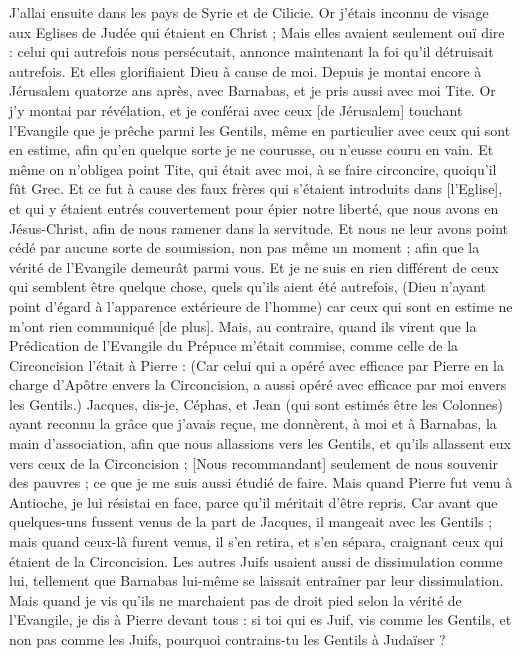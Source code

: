 \begin{multicols}{2}
J'allai ensuite dans les pays de Syrie et de Cilicie.
Or j'étais inconnu de visage aux Eglises de Judée qui étaient en Christ ;
Mais elles avaient seulement ouï dire : celui qui autrefois nous persécutait, annonce maintenant la foi qu'il détruisait autrefois.
Et elles glorifiaient Dieu à cause de moi.
\VerseOne{}Depuis je montai encore à Jérusalem quatorze ans après, avec Barnabas, et je pris aussi avec moi Tite.
Or j'y montai par révélation, et je conférai avec ceux [de Jérusalem] touchant l'Evangile que je prêche parmi les Gentils, même en particulier avec ceux qui sont en estime, afin qu'en quelque sorte je ne courusse, ou n'eusse couru en vain.
Et même on n'obligea point Tite, qui était avec moi, à se faire circoncire, quoiqu'il fût Grec.
Et ce fut à cause des faux frères qui s'étaient introduits dans [l'Eglise], et qui y étaient entrés couvertement pour épier notre liberté, que nous avons en Jésus-Christ, afin de nous ramener dans la servitude.
Et nous ne leur avons point cédé par aucune sorte de soumission, non pas même un moment ; afin que la vérité de l'Evangile demeurât parmi vous.
Et je ne suis en rien différent de ceux qui semblent être quelque chose, quels qu'ils aient été autrefois, (Dieu n'ayant point d'égard à l'apparence extérieure de l'homme) car ceux qui sont en estime ne m'ont rien communiqué [de plus].
Mais, au contraire, quand ils virent que la Prédication de l'Evangile du Prépuce m'était commise, comme celle de la Circoncision l'était à Pierre :
(Car celui qui a opéré avec efficace par Pierre en la charge d'Apôtre envers la Circoncision, a aussi opéré avec efficace par moi envers les Gentils.)
Jacques, dis-je, Céphas, et Jean (qui sont estimés être les Colonnes) ayant reconnu la grâce que j'avais reçue, me donnèrent, à moi et à Barnabas, la main d'association, afin que nous allassions vers les Gentils, et qu'ils allassent eux vers ceux de la Circoncision ;
[Nous recommandant] seulement de nous souvenir des pauvres ; ce que je me suis aussi étudié de faire.
Mais quand Pierre fut venu à Antioche, je lui résistai en face, parce qu'il méritait d'être repris.
Car avant que quelques-uns fussent venus de la part de Jacques, il mangeait avec les Gentils ; mais quand ceux-là furent venus, il s'en retira, et s'en sépara, craignant ceux qui étaient de la Circoncision.
Les autres Juifs usaient aussi de dissimulation comme lui, tellement que Barnabas lui-même se laissait entraîner par leur dissimulation.
Mais quand je vis qu'ils ne marchaient pas de droit pied selon la vérité de l'Evangile, je dis à Pierre devant tous : si toi qui es Juif, vis comme les Gentils, et non pas comme les Juifs, pourquoi contrains-tu les Gentils à Judaïser ?

\end{multicols}
